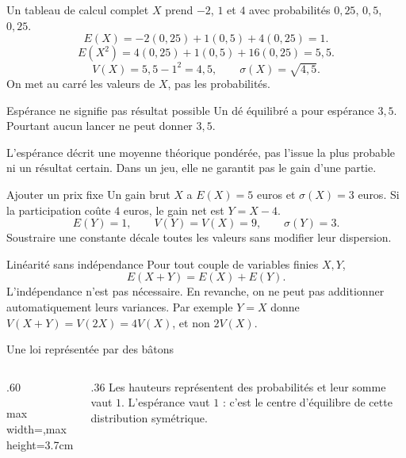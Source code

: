 \documentclass[aspectratio=169,12pt]{beamer}
\begin{document}
\renewcommand{\slidekind}{MÉTHODE \& EXEMPLE}
\begin{frame}[t,fragile]{Un tableau de calcul complet}
$X$ prend $-2$, $1$ et $4$ avec probabilités $0,25$, $0,5$, $0,25$.\[E(X)=-2(0,25)+1(0,5)+4(0,25)=1.\]\[E(X^2)=4(0,25)+1(0,5)+16(0,25)=5,5.\]\[V(X)=5,5-1^2=4,5,\qquad\sigma(X)=\sqrt{4,5}.\] On met au carré les valeurs de $X$, pas les probabilités.
\end{frame}
\renewcommand{\slidekind}{COMPRENDRE}
\begin{frame}[t,fragile]{Espérance ne signifie pas résultat possible}
Un dé équilibré a pour espérance $3,5$. Pourtant aucun lancer ne peut donner $3,5$.\medskip\par L’espérance décrit une moyenne théorique pondérée, pas l’issue la plus probable ni un résultat certain. Dans un jeu, elle ne garantit pas le gain d’une partie.
\end{frame}
\renewcommand{\slidekind}{COMPRENDRE}
\begin{frame}[t,fragile]{Ajouter un prix fixe}
Un gain brut $X$ a $E(X)=5$ euros et $\sigma(X)=3$ euros. Si la participation coûte $4$ euros, le gain net est $Y=X-4$.\[E(Y)=1,\qquad V(Y)=V(X)=9,\qquad\sigma(Y)=3.\] Soustraire une constante décale toutes les valeurs sans modifier leur dispersion.
\end{frame}
\renewcommand{\slidekind}{COMPRENDRE}
\begin{frame}[t,fragile]{Linéarité sans indépendance}
Pour tout couple de variables finies $X,Y$,\[E(X+Y)=E(X)+E(Y).\] L’indépendance n’est pas nécessaire. En revanche, on ne peut pas additionner automatiquement leurs variances. Par exemple $Y=X$ donne $V(X+Y)=V(2X)=4V(X)$, et non $2V(X)$.
\end{frame}
\renewcommand{\slidekind}{COMPRENDRE}
\begin{frame}[t,fragile]{Une loi représentée par des bâtons}
\begin{columns}[c,onlytextwidth]\begin{column}{.60\textwidth}\centering\begin{adjustbox}{max width=\linewidth,max height=3.7cm}\end{adjustbox}\end{column}\begin{column}{.36\textwidth} Les hauteurs représentent des probabilités et leur somme vaut $1$. L’espérance vaut $1$ : c’est le centre d’équilibre de cette distribution symétrique.\end{column}\end{columns}
\end{frame}
\end{document}

